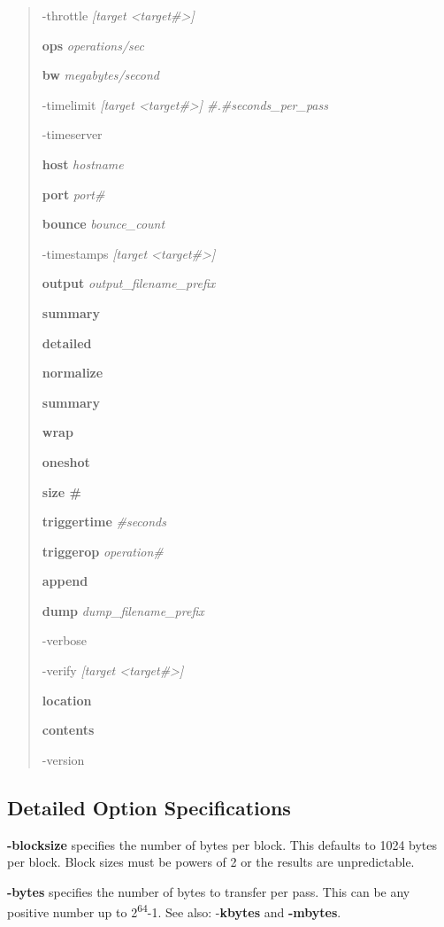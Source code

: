 \begin{quote}
-throttle \emph{{[}target \textless target\#\textgreater{]}}

\textbf{ops} \emph{operations/sec}

\textbf{bw} \emph{megabytes/second}

-timelimit \emph{{[}target \textless target\#\textgreater{]} \#.\#seconds\_per\_pass}

-timeserver

\textbf{host} \emph{hostname}

\textbf{port} \emph{port\#}

\textbf{bounce} \emph{bounce\_count}

-timestamps \emph{{[}target \textless target\#\textgreater{]}}

\textbf{output} \emph{output\_filename\_prefix}

\textbf{summary}

\textbf{detailed}

\textbf{normalize}

\textbf{summary}

\textbf{wrap}

\textbf{oneshot}

\textbf{size \#}

\textbf{triggertime} \emph{\#seconds}

\textbf{triggerop} \emph{operation\#}

\textbf{append}

\textbf{dump} \emph{dump\_filename\_prefix}

-verbose

-verify \emph{{[}target \textless target\#\textgreater{]}}

\textbf{location}

\textbf{contents}

-version
\end{quote}

\subsection{Detailed Option Specifications}\label{detailed-option-specifications}

\textbf{-blocksize} specifies the number of bytes per block. This defaults to 1024 bytes per block. Block sizes must be powers of 2 or the results are unpredictable.

\textbf{-bytes} specifies the number of bytes to transfer per pass. This can be any positive number up to 2\textsuperscript{64}-1. See also: -\textbf{kbytes} and \textbf{-mbytes}.

